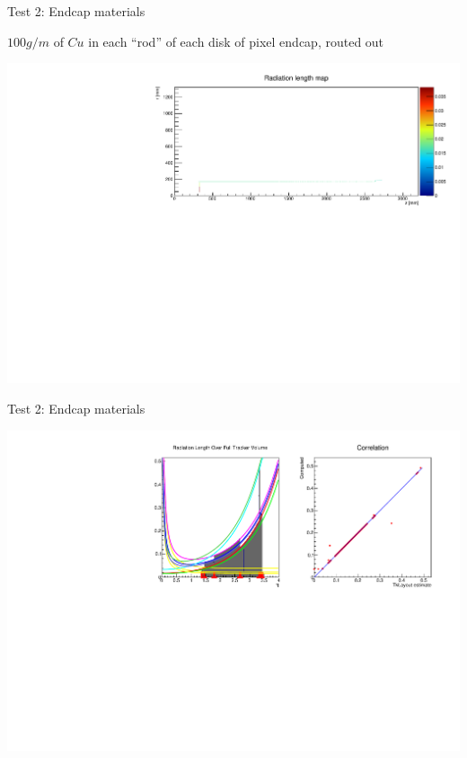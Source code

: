 \documentclass[pdftex, 11pt]{beamer}
\begin{document}
\begin{frame}{Test 2: Endcap materials}
  \begin{block}{}
    \alert{$100g/m$} of \alert{$Cu$} in each ``rod'' of each disk of pixel endcap, routed out
  \end{block}
  \begin{center}
    \includegraphics[width=\textwidth]{img/test6-map.pdf}
  \end{center}
\end{frame}
\begin{frame}{Test 2: Endcap materials}
  \begin{center}
    \includegraphics[width=\textwidth]{img/test6-out.pdf}
  \end{center}
\end{frame}
\end{document}
